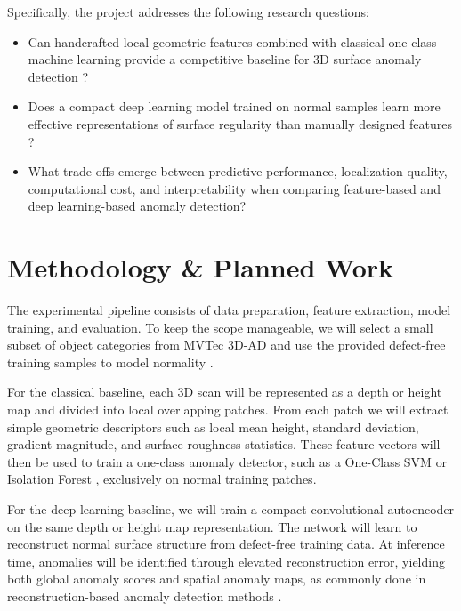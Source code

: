 Specifically, the project addresses the following research questions:
\begin{itemize}
    \item Can handcrafted local geometric features combined with classical one-class machine learning provide a competitive baseline for 3D surface anomaly detection \cite{scholkopf2001estimating,liu2008isolation}?
    \item Does a compact deep learning model trained on normal samples learn more effective representations of surface regularity than manually designed features \cite{li2025surveyindustrialad}?
    \item What trade-offs emerge between predictive performance, localization quality, computational cost, and interpretability when comparing feature-based and deep learning-based anomaly detection?
\end{itemize}

\section{Methodology \& Planned Work}

The experimental pipeline consists of data preparation, feature extraction, model training, and evaluation. To keep the scope manageable, we will select a small subset of object categories from MVTec 3D-AD and use the provided defect-free training samples to model normality \cite{bergmann2022mvtec3d}.

For the classical baseline, each 3D scan will be represented as a depth or height map and divided into local overlapping patches. From each patch we will extract simple geometric descriptors such as local mean height, standard deviation, gradient magnitude, and surface roughness statistics. These feature vectors will then be used to train a one-class anomaly detector, such as a One-Class SVM \cite{scholkopf2001estimating} or Isolation Forest \cite{liu2008isolation}, exclusively on normal training patches.

For the deep learning baseline, we will train a compact convolutional autoencoder on the same depth or height map representation. The network will learn to reconstruct normal surface structure from defect-free training data. At inference time, anomalies will be identified through elevated reconstruction error, yielding both global anomaly scores and spatial anomaly maps, as commonly done in reconstruction-based anomaly detection methods \cite{li2025surveyindustrialad}.

